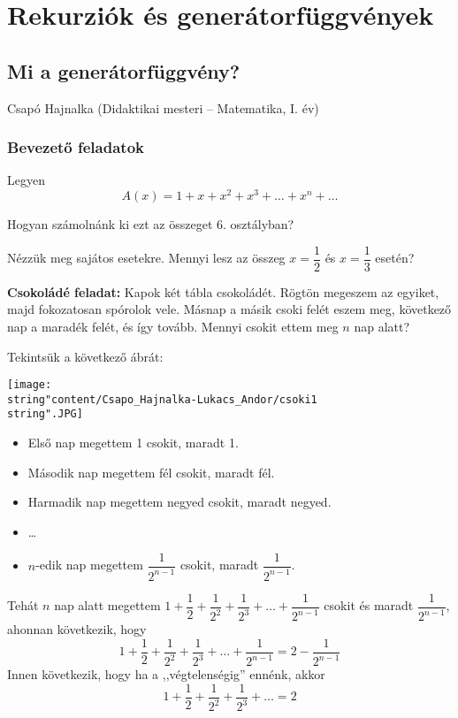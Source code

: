 
\chapter{Rekurziók és generátorfüggvények}\label{chap:generatorf}

\section{Mi a generátorfüggvény?}\label{sec:mi_a_generatorf}
\begin{description}
{\large \item [{Szerző:}] Csapó Hajnalka (Didaktikai mesteri -- Matematika, I. év)}
\end{description}

\subsection*{Bevezető feladatok}
\begin{problem}
Legyen 
\[
A(x)=1+x+x^{2}+x^{3}+\dots+x^{n}+\dots
\]

Hogyan számolnánk ki ezt az összeget 6. osztályban?

Nézzük meg sajátos esetekre. Mennyi lesz az összeg $x=\dfrac{1}{2}$
és $x=\dfrac{1}{3}$ esetén?
\end{problem}

\begin{problem}\textbf{Csokoládé feladat:} Kapok két tábla csokoládét. Rögtön megeszem az egyiket, majd fokozatosan
spórolok vele. Másnap a másik csoki felét eszem meg, következő nap
a maradék felét, és így tovább. Mennyi csokit ettem meg $n$ nap alatt?
\end{problem}
\begin{solution} Tekintsük a következő ábrát:
\begin{center}
	\texttt{[image: \\string"content/Csapo\_Hajnalka-Lukacs\_Andor/csoki1\\string".JPG]}
\end{center}
\begin{itemize}
	\item Első nap megettem 1 csokit, maradt 1.
	\item Második nap megettem fél csokit, maradt fél.
	\item Harmadik nap megettem negyed csokit, maradt negyed.
	\item \ldots
	\item $n$-edik nap megettem $\dfrac{1}{2^{n-1}}$ csokit, maradt $\dfrac{1}{2^{n-1}}$.
\end{itemize}
Tehát $n$ nap alatt megettem $1+\dfrac{1}{2}+\dfrac{1}{2^{2}}+\dfrac{1}{2^{3}}+\dots+\dfrac{1}{2^{n-1}}$
csokit és maradt $\dfrac{1}{2^{n-1}}$, ahonnan következik, hogy 
\[
1+\dfrac{1}{2}+\dfrac{1}{2^{2}}+\dfrac{1}{2^{3}}+\dots+\dfrac{1}{2^{n-1}}=2-\dfrac{1}{2^{n-1}}
\]
Innen következik, hogy ha a ,,végtelenségig'' ennénk, akkor 
\[
1+\dfrac{1}{2}+\dfrac{1}{2^{2}}+\dfrac{1}{2^{3}}+\dots=2
\]
\end{solution}


